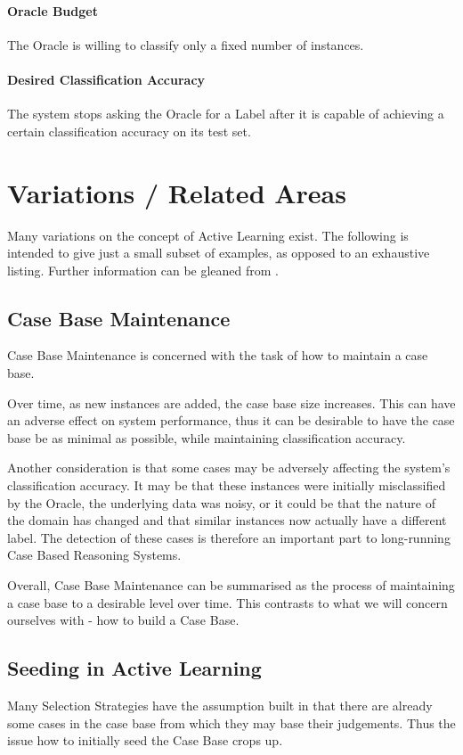 \documentclass[a4paper,11pt]{report}
\begin{document}
\paragraph{Oracle Budget} 
The Oracle is willing to classify only a fixed number of instances.

\paragraph{Desired Classification Accuracy} 
The system stops asking the Oracle for a Label after it is capable of achieving a certain classification accuracy on its test set.

\section{Variations / Related Areas}
Many variations on the concept of Active Learning exist. The following is intended to give just a small subset of examples, as opposed to an exhaustive listing. Further information can be gleaned from \citep{Settles2010}.

\subsection{Case Base Maintenance}
Case Base Maintenance is concerned with the task of how to maintain a case base. 

Over time, as new instances are added, the case base size increases. This can have an adverse effect on system performance, thus it can be desirable to have the case base be as minimal as possible, while maintaining classification accuracy.

Another consideration is that some cases may be adversely affecting the system's classification accuracy. It may be that these instances were initially misclassified by the Oracle, the underlying data was noisy, or it could be that the nature of the domain has changed and that similar instances now actually have a different label. The detection of these cases is therefore an important part to long-running Case Based Reasoning Systems.

Overall, Case Base Maintenance can be summarised as the process of maintaining a case base to a desirable level over time. This contrasts to what we will concern ourselves with - how to build a Case Base.

\subsection{Seeding in Active Learning}
Many Selection Strategies have the assumption built in that there are already some cases in the case base from which they may base their judgements. Thus the issue how to initially seed the Case Base crops up.
\end{document}
